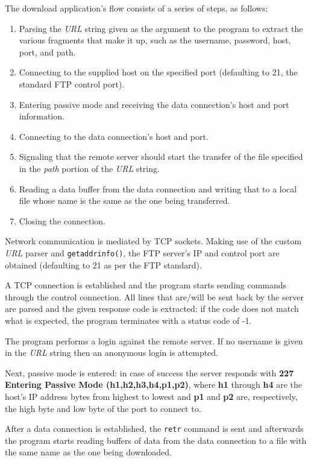 \documentclass[11pt,a4paper,twocolumn]{article}
\begin{document}
The download application's flow consists of a series of steps, as follows:

\begin{enumerate}
    \item Parsing the \textit{URL} string given as the argument to the program to extract the various fragments that make it up, such as the username, password, host, port, and path.
    \item Connecting to the supplied host on the specified port (defaulting to 21, the standard FTP control port).
    \item Entering passive mode and receiving the data connection's host and port information.
    \item Connecting to the data connection's host and port.
    \item Signaling that the remote server should start the transfer of the file specified in the \textit{path} portion of the \textit{URL} string.
    \item Reading a data buffer from the data connection and writing that to a local file whose name is the same as the one being transferred.
    \item Closing the connection.
\end{enumerate}

Network communication is mediated by TCP sockets.
Making use of the custom \textit{URL} parser and \lstinline{getaddrinfo()}, the FTP server's IP and control port are obtained (defaulting to 21 as per the FTP standard).

A TCP connection is established and the program starts sending commands through the control connection. All lines that are/will be sent back by the server are parsed and the given response code is extracted: if the code does not match what is expected, the program terminates with a status code of -1.

The program performs a login against the remote server. If no username is given in the \textit{URL} string then an anonymous login is attempted.

Next, passive mode is entered: in case of success the server responds with \textbf{227 Entering Passive Mode (h1,h2,h3,h4,p1,p2)}, where \textbf{h1} through \textbf{h4} are the host's IP address bytes from highest to lowest and \textbf{p1} and \textbf{p2} are, respectively, the high byte and low byte of the port to connect to.

After a data connection is established, the \lstinline{retr} command is sent and afterwards the program starts reading buffers of data from the data connection to a file with the same name as the one being downloaded.
\end{document}
